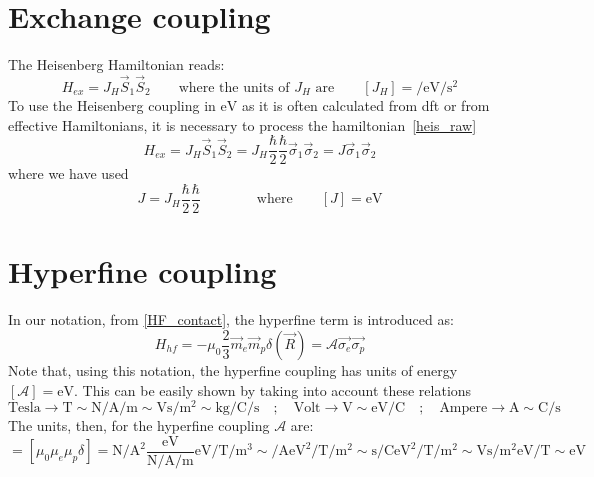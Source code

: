 \section{Exchange coupling}
The Heisenberg Hamiltonian reads:
\begin{equation}
  H_{ex} = J_H\vec{S}_1\vec{S}_2\qquad\text{where the units of $J_H$ are}\qquad
  [J_H]=\si{\per\eV\per\s\squared}
\label{heis_raw}
\end{equation}
To use the Heisenberg coupling in $\si{\eV}$ as it is often calculated from \ac{dft} or from effective Hamiltonians, it is necessary to process the hamiltonian~\eqref{heis_raw}
\begin{equation}
  H_{ex} = J_H\vec{S}_1\vec{S}_2 = J_H\frac{\hbar}{2}\frac{\hbar}{2}\vec{\sigma}_1\vec{\sigma}_2 =
  J\vec{\sigma}_1\vec{\sigma}_2
\end{equation}
where we have used
\begin{equation}
 J=J_H\frac{\hbar}{2}\frac{\hbar}{2}\qquad\qquad\text{where}\qquad [J]=\si{\eV}
\end{equation}


\section{Hyperfine coupling}
\label{units_A}
In our notation, from \eqref{HF_contact}, the hyperfine term is introduced as:
\begin{equation}
  H_{hf} = -\mu_0\frac{2}{3} \vec{m}_e\vec{m}_p\delta(\vec{R}) = \mathcal{A}\vec{\sigma_e}\vec{\sigma_p}
\end{equation}
Note that, using this notation, the hyperfine coupling has units of energy $[\mathcal{A}]=\si{\eV}$. This can be easily shown by taking into account these relations
\begin{equation}
  \text{Tesla}\rightarrow\si{\tesla} \sim
  \si{\newton\per\ampere\per\m}\sim\si{\volt\s\per\m\squared} \sim
  \si{\kilogram\per\coulomb\per\s}  \quad;\quad
  \text{Volt}\rightarrow\si{\V}\sim\si{\eV\per\coulomb}  \quad;\quad
  \text{Ampere}\rightarrow\si{\ampere}\sim\si{\coulomb\per\s}
\end{equation}
The units, then, for the hyperfine coupling $\mathcal{A}$ are:
\begin{equation}
  [\mathcal{A}] = \left[\mu_0\mu_e\mu_p\delta\right] =
  \si{\newton\per\ampere\squared}\frac{\si{\eV}}{\si{\newton\per\ampere\per\m}}
  \si{\eV\per\tesla}\si{\per\m\cubed} \sim
  \si{\per\ampere}\si{\eV\squared\per\tesla}\si{\per\m\squared} \sim
  \si{\s\per\coulomb}\si{\eV\squared\per\tesla}\si{\per\m\squared} \sim
  \si{\V\s\per\m\squared}\si{\eV\per\tesla}\sim \si{\eV}
\end{equation}



